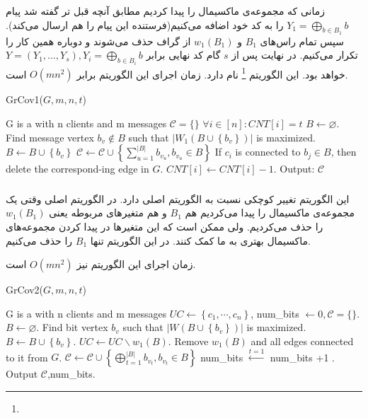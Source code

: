 زمانی که مجموعه‌ی ماکسیمال را پیدا کردیم مطابق آنچه قبل تر گفته شد پیام
 $Y_1 = \bigoplus\limits_{b \in B_1} b$
 را به کد خود اضافه می‌کنیم(فرستنده این پیام را هم ارسال می‌کند). سپس تمام راس‌های
 $B_1$
 و
 $w_1(B_1)$
 از گراف حذف می‌شوند و دوباره همین کار را تکرار می‌کنیم. در نهایت پس از 
 $s$
 گام کد نهایی برابر
 $Y = (Y_1, \ldots, Y_s), Y_i =  \bigoplus\limits_{b \in B_i} b$
 خواهد بود. این الگوریتم
 \GRCOVone\footnote{}
 	نام دارد. زمان اجرای این الگوریتم برابر
 	$O(mn^2)$
 	است.
 	\begin{algorithm}[H]
 		\caption{GrCov1($G,m,n,t$) \cite{pliable2015paper}}
 		\label{algorithm:grcov1}
 		\begin{algorithmic}[1]
 			\State G is a \picodt with n clients and m messages
 			\State $\mathcal{C} = \{\}$
 			\State $\forall i \in [n]: CNT[i] = t$ 
		 			\State $B \leftarrow \varnothing$.
				 			\State Find message vertex $b_v \notin B$ such that $\left|W_1\left(B \cup\left\{b_v\right\}\right)\right|$ is maximized.
				 			\State $B \leftarrow B \cup\left\{b_v\right\}$
		 			\EndWhile
		 			\State $\mathcal{C} \leftarrow \mathcal{C} \cup\left\{\sum_{u=1}^{|B|} b_{v_u}, b_{v_u} \in B\right\}$
		 			\State If $c_i$ is connected to $b_j \in B$, then delete the correspond-ing edge in $G$.
		 			\State $CNT[i] \leftarrow CNT[i]-1$.
		 			\EndFor
 			\EndWhile
 			\State Output: $\mathcal{C}$
 		\end{algorithmic}
 	\end{algorithm}
 \subsubsection{
 }
 این الگوریتم تغییر کوچکی نسبت به الگوریتم اصلی دارد. در الگوریتم اصلی وقتی یک مجموعه‌ی ماکسیمال را پیدا می‌کردیم هم
 $B_1$
 و هم متغیرهای مربوطه یعنی
 $w_1(B_1)$
 را حذف می‌کردیم. ولی ممکن است که این متغیرها در پیدا کردن مجموعه‌های ماکسیمال بهتری به ما کمک کنند. در این الگوریتم تنها
 $B_1$
 را حذف می‌کنیم.
 
 زمان اجرای این الگوریتم نیز
 $O(mn^2)$
 است.
 	\begin{algorithm}[H]
 	\caption{GrCov2($G,m,n,t$) \cite{pliablefirstpaper}}
 	\label{algorithm:grcov2}
 	\begin{algorithmic}[1]
 		\State G is a \picodt with n clients and m messages
 		\State  $U C \leftarrow\left\{c_1, \cdots, c_n\right\}$,
 		\State  num\_bits $\leftarrow 0, \mathcal{C}=\{\}$.
		 		\State $B \leftarrow \varnothing$.
				 		\State  Find bit vertex $b_v$ such that $\left|W\left(B \cup\left\{b_v\right\}\right)\right|$ is maximized.
				 		\State  $B \leftarrow B \cup\left\{b_v\right\}$.
		 		\EndWhile
		 		\State  $UC \leftarrow UC \backslash w_1(B)$.
		 		\State Remove $w_1(B)$ and all edges connected to it from $G$.
		 		\State  $\mathcal{C} \leftarrow \mathcal{C} \cup\left\{\bigoplus_{t=1}^{|B|} b_{v_t}, b_{v_t} \in B\right\}$
		 		\State  num\_bits $\stackrel{t=1}{\leftarrow}$ num\_bits +1 .
 		\EndWhile
 		\State  Output $\mathcal{C}$,num\_bits.
 	\end{algorithmic}
 \end{algorithm} 
